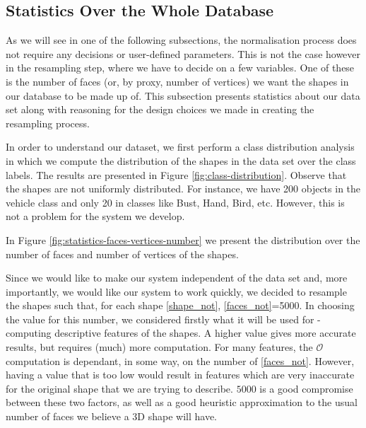\subsection{Statistics Over the Whole Database}
As we will see in one of the following subsections, the normalisation process does not require any decisions or user-defined parameters.
This is not the case however in the resampling step, where we have to decide on a few variables.
One of these is the number of faces (or, by proxy, number of vertices) we want the shapes in our database to be made up of.
This subsection presents statistics about our data set along with reasoning for the design choices we made in creating the resampling process.

In order to understand our dataset, we first perform a class distribution analysis in which we compute the distribution of the shapes in the data set over the class labels.
The results are presented in Figure \ref{fig:class-distribution}.
Observe that the shapes are not uniformly distributed.
For instance, we have 200 objects in the vehicle class and only 20 in classes like Bust, Hand, Bird, etc.
However, this is not a problem for the system we develop.


In Figure \ref{fig:statistics-faces-vertices-number} we present the distribution over the number of faces and number of vertices of the shapes.

Since we would like to make our system independent of the data set and, more importantly, we would like our system to work quickly, we decided to resample the shapes such that, for each shape \ref{shape_not}, \ref{faces_not}=5000.
In choosing the value for this number, we considered firstly what it will be used for - computing descriptive features of the shapes.
A higher value gives more accurate results, but requires (much) more computation.
For many features, the $\mathcal{O}$ computation is dependant, in some way, on the number of \ref{faces_not}.
However, having a value that is too low would result in features which are very inaccurate for the original shape that we are trying to describe.
$5000$ is a good compromise between these two factors, as well as a good heuristic approximation to the usual number of faces we believe a 3D shape will have.

